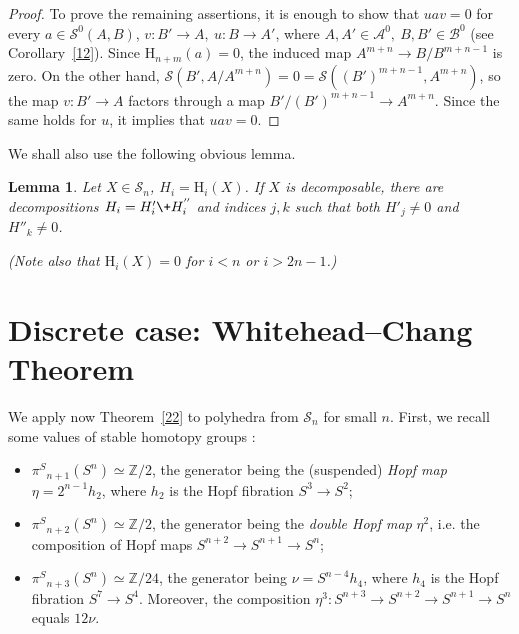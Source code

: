 \documentclass[12pt,a4paper]{amsart}
\newtheorem{lemma}[theorem]{Lemma}
\theoremstyle{definition}
\theoremstyle{remark}
\numberwithin{equation}{section}
\begin{document}
\begin{proof}
 To prove the remaining assertions, it is enough to show that $uav=0$ for every $a\in{\mathscr S}^0(A,B)$,
 $v:B'\to A,\ u: B\to A'$, where $A,A'\in{\mathscr A}^0,\ B,B'\in{\mathscr B}^0$ (see Corollary~\ref{12}).
 Since ${\mathrm H}_{n+m}(a)=0$, the induced map $A^{m+n}\to B/B^{m+n-1}$ is zero. On the other hand,
 ${\mathscr S}(B',A/A^{m+n})=0={\mathscr S}((B')^{m+n-1},A^{m+n})$, so the map $v:B'\to A$ factors through a map
 $B'/(B')^{m+n-1}\to A^{m+n}$. Since the same holds for $u$, it implies that $uav=0$.
 \end{proof}
 
 We shall also use the following obvious lemma.

 \begin{lemma}\label{25}
  Let $X\in{\mathscr S}_n$, $H_i={\mathrm H}_i(X)$. If $X$ is decomposable, there are decompositions 
 $H_i=H'_i\+H^{''}_i$ and indices $j,k$ such that both $H'_j\ne0$ and $H''_k\ne0$. 

 \emph{(Note also that ${\mathrm H}_i(X)=0$ for $i<n$ or $i>2n-1$.)}
 \end{lemma}

 \section{Discrete case: Whitehead--Chang Theorem}
 \label{s3}

 We apply now Theorem~\ref{22} to polyhedra from ${\mathscr S}_n$ for small $n$.
 First, we recall some values of stable homotopy groups \cite[Sections~XI.15--16]{hu}:
 \begin{itemize}
\item  ${\pi^S}_{n+1}(S^n)\simeq{\mathbb Z}/2$, the generator being the (suspended) \emph{Hopf map}
 $\eta=2^{n-1}h_2$, where $h_2$ is the Hopf fibration $S^3\to S^2$;
 \item  ${\pi^S}_{n+2}(S^n)\simeq{\mathbb Z}/2$, the generator being the \emph{double Hopf map}
 $\eta^2$, i.e. the composition of Hopf maps $S^{n+2}\to S^{n+1}\to S^n$;
 \item  ${\pi^S}_{n+3}(S^n)\simeq{\mathbb Z}/24$, the generator being $\nu=S^{n-4}h_4$, where
 $h_4$ is the Hopf fibration $S^7\to S^4$. Moreover, the composition
 $\eta^3:S^{n+3}\to S^{n+2}\to S^{n+1}\to S^n$ equals $12\nu$.
\end{itemize}
\end{document}
